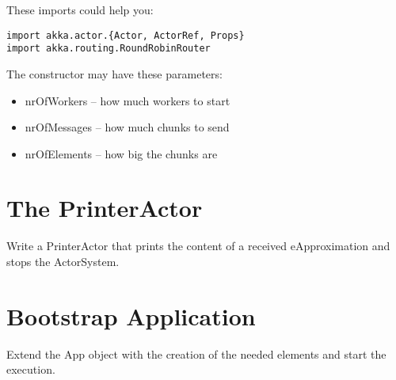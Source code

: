 \documentclass[11pt]{tudexercise}
\begin{document}
These imports could help you:
\begin{verbatim}
import akka.actor.{Actor, ActorRef, Props}
import akka.routing.RoundRobinRouter
\end{verbatim}

The constructor may have these parameters:
\begin{itemize}
\item nrOfWorkers – how much workers to start
\item nrOfMessages – how much chunks to send
\item nrOfElements – how big the chunks are
\end{itemize}

\section{The PrinterActor}

Write a PrinterActor that prints the content of a received  eApproximation and stops the ActorSystem.

\section{Bootstrap Application}

Extend the App object with the creation of the needed elements and start the execution.
\end{document}
